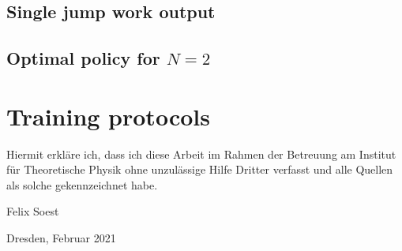 \section{Single jump work output}


\section{Optimal policy for $N=2$} \label{n2_opt_pol}

\chapter{Training protocols}








\clearpage
\thispagestyle{empty}
\vspace*{1.5em}

Hiermit erkläre ich, dass ich diese Arbeit im Rahmen der Betreuung am Institut
für Theoretische Physik ohne unzulässige Hilfe Dritter verfasst und alle Quellen als solche gekennzeichnet habe.

\vspace*{45em}

Felix Soest \par
Dresden, Februar 2021


